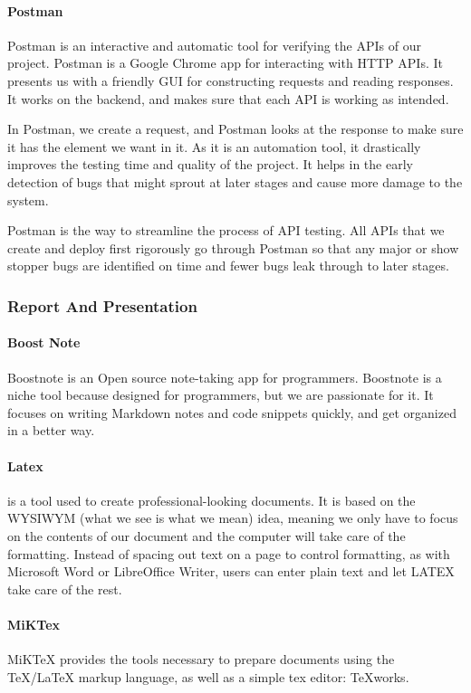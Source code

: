 \paragraph{Postman}
Postman is an interactive and automatic tool for verifying the APIs of our project. Postman is a Google Chrome app for interacting with HTTP APIs. It presents us with a friendly GUI for constructing requests and reading responses. It works on the backend, and makes sure that each API is working as intended.

In Postman, we create a request, and Postman looks at the response to make sure it has the element we want in it. As it is an automation tool, it drastically improves the testing time and quality of the project. It helps in the early detection of bugs that might sprout at later stages and cause more damage to the system.

Postman is the way to streamline the process of API testing. All APIs that we create and deploy first rigorously go through Postman so that any major or show stopper bugs are identified on time and fewer bugs leak through to later stages.




\subsubsection{Report And Presentation}
\paragraph{Boost Note}
Boostnote is an Open source note-taking app for programmers.
Boostnote is a niche tool because designed for programmers, but we are passionate for it.
It focuses on writing Markdown notes and code snippets quickly, and get organized in a better way.

\paragraph{Latex}
\latex{} is a tool used to create professional-looking documents. It is based on the WYSIWYM (what we see is what we mean) idea, meaning we only have to focus on the contents of our document and the computer will take care of the formatting. Instead of spacing out text on a page to control formatting, as with Microsoft Word or LibreOffice Writer, users can enter plain text and let LATEX take care of the rest.
\paragraph{MiKTex}
MiKTeX provides the tools necessary to prepare documents using the TeX/LaTeX markup language, as well as a simple tex editor: TeXworks.

